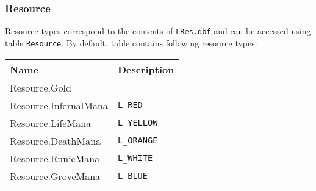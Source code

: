 \subsubsection{Resource}
\label{Resource}
Resource types correspond to the contents of \texttt{LRes.dbf} and can be accessed using table \texttt{Resource}.
By default, table contains following resource types:\\
\begin{tabularx}{\linewidth}{| l | X |}
\hline
\textbf{Name} & \textbf{Description} \\
\hline
Resource.Gold &\\
\hline
Resource.InfernalMana & \texttt{L\_RED}\\
\hline
Resource.LifeMana & \texttt{L\_YELLOW}\\
\hline
Resource.DeathMana & \texttt{L\_ORANGE}\\
\hline
Resource.RunicMana & \texttt{L\_WHITE}\\
\hline
Resource.GroveMana & \texttt{L\_BLUE}\\
\hline
\end{tabularx}

